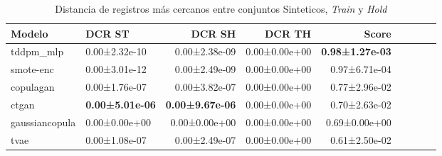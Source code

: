 \begin{table}[H]
\centering
\fontsize{10}{14}\selectfont
\caption{Distancia de registros más cercanos entre conjuntos Sinteticos, \emph{Train} y \emph{Hold}}
\label{table-dcr-economicos-a}
\begin{tabular}{|l|l|r|r|r|r|r|r|r|}
\hline
\rowcolor[gray]{0.8}
Modelo & DCR ST & DCR SH & DCR TH & \textbf{Score} \\
\hline tddpm\_mlp & 0.00±2.32e-10 & 0.00±2.38e-09 & 0.00±0.00e+00 & \bfseries 0.98±1.27e-03 \\
\hline smote-enc & 0.00±3.01e-12 & 0.00±2.49e-09 & 0.00±0.00e+00 & 0.97±6.71e-04 \\
\hline copulagan & 0.00±1.76e-07 & 0.00±3.82e-07 & 0.00±0.00e+00 & 0.77±2.96e-02 \\
\hline ctgan & \bfseries \cellcolor[rgb]{0.9, 0.54, 0.52} 0.00±5.01e-06 & \bfseries \cellcolor[rgb]{0.9, 0.54, 0.52} 0.00±9.67e-06 & 0.00±0.00e+00 & 0.70±2.63e-02 \\
\hline gaussiancopula & 0.00±0.00e+00 & 0.00±0.00e+00 & 0.00±0.00e+00 & 0.69±0.00e+00 \\
\hline tvae & 0.00±1.08e-07 & 0.00±2.49e-07 & 0.00±0.00e+00 & \cellcolor[rgb]{0.9, 0.54, 0.52} 0.61±2.50e-02 \\
\hline
\end{tabular}
\end{table}
